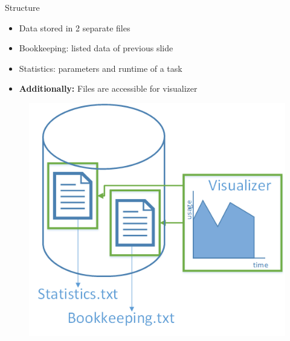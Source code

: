	\begin{frame}{Structure}
		\begin{minipage}[]{.5\textwidth}%
		\begin{itemize}
		\item<2->{} {Data stored in 2 separate files}
		\item<3->{} {Bookkeeping: listed data of previous slide}
		\item<4->{} {Statistics: parameters and runtime of a task}
		\item<5->{} {\textbf{Additionally: }Files are accessible for visualizer}
		\end{itemize}
		\end{minipage}
		\begin{minipage}[]{.45\textwidth}%
		\begin{figure}[h]
		\flushright  %
		\vspace{-\ht\strutbox}\includegraphics[width=\textwidth]{images/data.png}
		\end{figure}
		\end{minipage}
	\end{frame}
